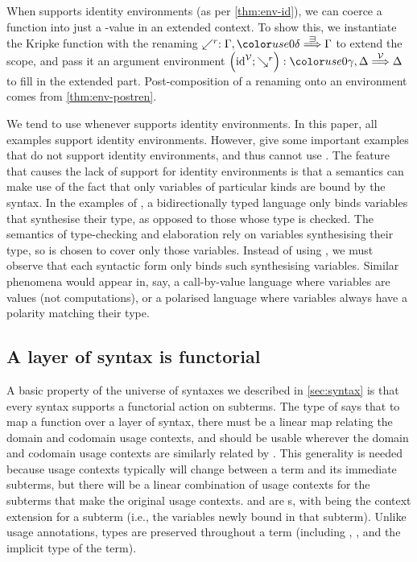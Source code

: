When \AgdaBound{$\V$} supports identity environments (as per \cref{thm:env-id}),
we can coerce a  function into just a
\AgdaBound{$\C$}-value in an extended context.
To show this, we instantiate the Kripke function with the renaming
$\swarrow^r : \Gamma, \gr0\delta \env\sqni \Gamma$ to extend the scope, and
pass it an argument environment
$\plr{\id^\V; \searrow^r} : \gr0\gamma, \Delta \env\V \Delta$ to fill in the
extended part.
Post-composition of a renaming onto an environment comes from
\cref{thm:env-postren}.


We tend to use  whenever \AgdaBound{$\V$} supports
identity environments.
In this paper, all examples support identity environments.
However, \citet[p.~27]{AACMM20} give some important examples that do not
support identity environments, and thus cannot use .
The feature that causes the lack of support for identity environments is that
a semantics can make use of the fact that only variables of particular kinds
are bound by the syntax.
In the examples of \citeauthor{AACMM20}, a bidirectionally typed language only
binds variables that synthesise their type, as opposed to those whose type is
checked.
The semantics of type-checking and elaboration rely on variables synthesising
their type, so \AgdaBound{$\V$} is chosen to cover only those variables.
Instead of using , we must observe that each syntactic form
only binds such synthesising variables.
Similar phenomena would appear in, say, a call-by-value language where
variables are values (not computations), or a polarised language where
variables always have a polarity matching their type.

\subsection{A layer of syntax is functorial}

A basic property of the universe of syntaxes we described in \cref{sec:syntax}
is that every syntax supports a functorial action on subterms.
The type of  says that to map a function 
over a layer of syntax, there must be a linear map  relating the
domain and codomain usage contexts, and  should be usable
wherever the domain and codomain usage contexts are similarly related by
.
This generality is needed because usage contexts typically will change between
a term and its immediate subterms, but there will be a linear combination of
usage contexts for the subterms that make the original usage contexts.
 and  are s, with
\AgdaBound{$\Theta$} being the context extension for a subterm (i.e., the
variables newly bound in that subterm).
Unlike usage annotations, types are preserved throughout a term (including
\AgdaBound{$\gamma$}, \AgdaBound{$\delta$}, and the implicit type of the term).

